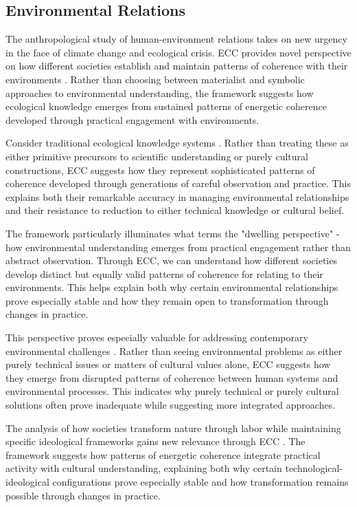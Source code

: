\subsection{Environmental Relations}

The anthropological study of human-environment relations takes on new urgency in the face of climate change and ecological crisis. ECC provides novel perspective on how different societies establish and maintain patterns of coherence with their environments \cite{ingold2000perception}. Rather than choosing between materialist and symbolic approaches to environmental understanding, the framework suggests how ecological knowledge emerges from sustained patterns of energetic coherence developed through practical engagement with environments.

Consider traditional ecological knowledge systems \cite{berkes2012sacred}. Rather than treating these as either primitive precursors to scientific understanding or purely cultural constructions, ECC suggests how they represent sophisticated patterns of coherence developed through generations of careful observation and practice. This explains both their remarkable accuracy in managing environmental relationships and their resistance to reduction to either technical knowledge or cultural belief.

The framework particularly illuminates what \cite{ingold2000perception} terms the "dwelling perspective" - how environmental understanding emerges from practical engagement rather than abstract observation. Through ECC, we can understand how different societies develop distinct but equally valid patterns of coherence for relating to their environments. This helps explain both why certain environmental relationships prove especially stable and how they remain open to transformation through changes in practice.

This perspective proves especially valuable for addressing contemporary environmental challenges \cite{tsing2015mushroom}. Rather than seeing environmental problems as either purely technical issues or matters of cultural values alone, ECC suggests how they emerge from disrupted patterns of coherence between human systems and environmental processes. This indicates why purely technical or purely cultural solutions often prove inadequate while suggesting more integrated approaches.

The analysis of how societies transform nature through labor while maintaining specific ideological frameworks gains new relevance through ECC \cite{bateson1972steps}. The framework suggests how patterns of energetic coherence integrate practical activity with cultural understanding, explaining both why certain technological-ideological configurations prove especially stable and how transformation remains possible through changes in practice.

